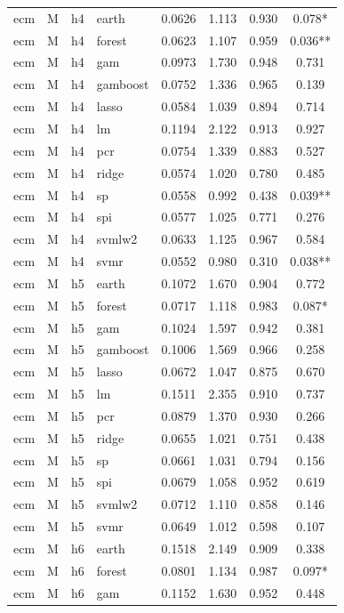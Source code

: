 \begin{ThreePartTable}
\begin{longtable}[t]{llclcccc}
\addlinespace
ecm & M & h4 & earth & 0.0626 & 1.113 & 0.930 & 0.078*\\
ecm & M & h4 & forest & 0.0623 & 1.107 & 0.959 & 0.036**\\
ecm & M & h4 & gam & 0.0973 & 1.730 & 0.948 & 0.731\\
ecm & M & h4 & gamboost & 0.0752 & 1.336 & 0.965 & 0.139\\
ecm & M & h4 & lasso & 0.0584 & 1.039 & 0.894 & 0.714\\
ecm & M & h4 & lm & 0.1194 & 2.122 & 0.913 & 0.927\\
ecm & M & h4 & pcr & 0.0754 & 1.339 & 0.883 & 0.527\\
ecm & M & h4 & ridge & 0.0574 & 1.020 & 0.780 & 0.485\\
ecm & M & h4 & sp & 0.0558 & 0.992 & 0.438 & 0.039**\\
ecm & M & h4 & spi & 0.0577 & 1.025 & 0.771 & 0.276\\
ecm & M & h4 & svmlw2 & 0.0633 & 1.125 & 0.967 & 0.584\\
ecm & M & h4 & svmr & 0.0552 & 0.980 & 0.310 & 0.038**\\
\addlinespace
ecm & M & h5 & earth & 0.1072 & 1.670 & 0.904 & 0.772\\
ecm & M & h5 & forest & 0.0717 & 1.118 & 0.983 & 0.087*\\
ecm & M & h5 & gam & 0.1024 & 1.597 & 0.942 & 0.381\\
ecm & M & h5 & gamboost & 0.1006 & 1.569 & 0.966 & 0.258\\
ecm & M & h5 & lasso & 0.0672 & 1.047 & 0.875 & 0.670\\
ecm & M & h5 & lm & 0.1511 & 2.355 & 0.910 & 0.737\\
ecm & M & h5 & pcr & 0.0879 & 1.370 & 0.930 & 0.266\\
ecm & M & h5 & ridge & 0.0655 & 1.021 & 0.751 & 0.438\\
ecm & M & h5 & sp & 0.0661 & 1.031 & 0.794 & 0.156\\
ecm & M & h5 & spi & 0.0679 & 1.058 & 0.952 & 0.619\\
ecm & M & h5 & svmlw2 & 0.0712 & 1.110 & 0.858 & 0.146\\
ecm & M & h5 & svmr & 0.0649 & 1.012 & 0.598 & 0.107\\
\addlinespace
ecm & M & h6 & earth & 0.1518 & 2.149 & 0.909 & 0.338\\
ecm & M & h6 & forest & 0.0801 & 1.134 & 0.987 & 0.097*\\
ecm & M & h6 & gam & 0.1152 & 1.630 & 0.952 & 0.448\\

\end{longtable}
\end{ThreePartTable}
